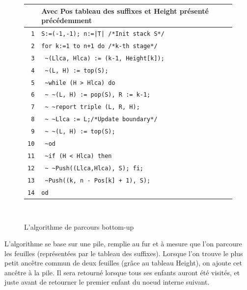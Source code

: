 \documentclass[a4paper,10pt]{article}
\begin{document}
\begin{figure}
  \centering
        \begin{tabular}{r|l}
         & Avec Pos tableau des suffixes et Height présenté
         précédemment\\
         \hline
        \texttt{1}  & \verb!S:=(-1,-1); n:=|T| /*Init stack S*/!\\
        \texttt{2}  & \verb!for k:=1 to n+1 do /*k-th stage*/!\\
        \texttt{3}  & \verb! ~(Llca, Hlca) := (k-1, Height[k]);!\\
        \texttt{4}  & \verb! ~(L, H) := top(S);!\\
        \texttt{5}  & \verb! ~while (H > Hlca) do!\\
        \texttt{6}  & \verb! ~ ~(L, H) := pop(S), R := k-1;!\\
        \texttt{7}  & \verb! ~ ~report triple (L, R, H);!\\
        \texttt{8}  & \verb! ~ ~Llca := L;/*Update boundary*/!\\
        \texttt{9}  & \verb! ~ ~(L, H) := top(S);!\\
        \texttt{10} & \verb! ~od!\\
        \texttt{11} & \verb! ~if (H < Hlca) then!\\
        \texttt{12} & \verb! ~ ~Push((Llca,Hlca), S); fi;!\\
        \texttt{13} & \verb! ~Push((k, n - Pos[k] + 1), S);!\\
        \texttt{14} & \verb!od!\\
      \end{tabular}\\
  \caption{L'algorithme de parcours bottom-up}
  \label{fig:bottomupalgo}
\end{figure}

L'algorithme se base sur une pile, remplie au fur et à mesure que l'on
parcoure les feuilles (représentées par le tableau des
suffixes). Lorsque l'on trouve le plus petit ancêtre commun de deux
feuilles (grâce au tableau Height), on ajoute cet ancêtre à la
pile. Il sera retourné lorsque tous ses enfants auront été visités, et
juste avant de retourner le premier enfant du noeud interne suivant.



\end{document}
